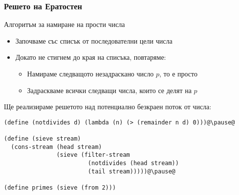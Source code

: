 \documentclass[alsotrans]{beamerswitch}
\begin{document}
\begin{frame}[fragile]
  \frametitle{Решето на Ератостен}

  \pause
  Алгоритъм за намиране на прости числа
  \pause
  \begin{itemize}
  \item Започваме със списък от последователни цели числа
  \item Докато не стигнем до края на списъка, повтаряме:
    \begin{itemize}
    \item Намираме следващото незадраскано число $p$, то е просто
    \item Задраскваме всички следващи числа, които се делят на $p$
    \end{itemize}
  \end{itemize}
  \pause
  Ще реализираме решетото над потенциално безкраен поток от числа:
  \pause
\begin{lstlisting}
(define (notdivides d) (lambda (n) (> (remainder n d) 0)))@\pause@

(define (sieve stream)
  (cons-stream (head stream)
               (sieve (filter-stream
                        (notdivides (head stream))
                        (tail stream)))))@\pause@

(define primes (sieve (from 2)))
\end{lstlisting}
\end{frame}
\end{document}
